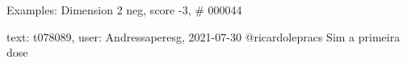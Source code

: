 \begin{frame}{Examples: Dimension 2 neg, score -3, \# 000044}
\footnotesize
\begin{alertblock}{text: t078089, user: Andressaperesg, 2021-07-30}
@ricardolepracs Sim a primeira dose  
\textbf{} 
\end{alertblock}
\end{frame}
